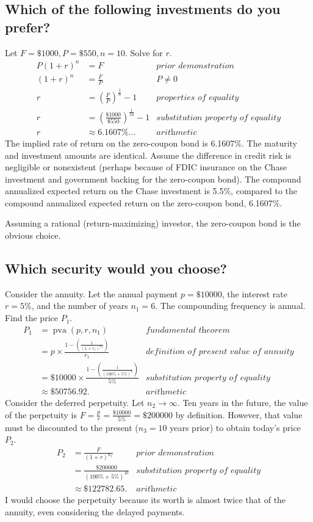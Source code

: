 \documentclass[12pt]{article}
\DeclareMathOperator{\pva}{pva}
\begin{document}
\subsection{Which of the following investments do you prefer?}
Let $F=\$1000,P=\$550,n=10$. Solve for $r$.
\begin{align*}
P(1+r)^n&=F&\textit{prior demonstration}\\
(1+r)^n&=\frac{F}{P}&\textit{$P\neq 0$}\\
r&=\left(\frac{F}{P}\right)^{\frac{1}{n}}-1&\textit{properties of equality}\\
r&=\left(\frac{\$1000}{\$550}\right)^{\frac{1}{10}}-1&\textit{substitution property of equality}\\
r&\approx 6.1607\%\dots&\textit{arithmetic}
\end{align*}
The implied rate of return on the zero-coupon bond is 6.1607\%. The maturity and investment amounts are identical. Assume the difference in credit risk is negligible or nonexistent (perhaps because of FDIC insurance on the Chase investment and government backing for the zero-coupon bond). The compound annualized expected return on the Chase investment is 5.5\%, compared to the compound annualized expected return on the zero-coupon bond, 6.1607\%.

Assuming a rational (return-maximizing) investor, the zero-coupon bond is the obvious choice.
\subsection{Which security would you choose?}
Consider the annuity. Let the annual payment $p=\$10000$, the interest rate $r=5\%$, and the number of years $n_1=6$. The compounding frequency is annual. Find the price $P_1$.
\begin{align*}
P_1&=\pva(p,r,n_1)&\textit{fundamental theorem}\\
&=p\times\frac{1-\left(\frac{1}{(1+r_1)^{n_1}}\right)}{r_1}&\textit{definition of present value of annuity}\\
&=\$10000\times\frac{1-\left(\frac{1}{(100\%+5\%)^6}\right)}{5\%}&\textit{substitution property of equality}\\
&\approx\$50756.92.&\textit{arithmetic}
\end{align*}
Consider the deferred perpetuity. Let $n_2\to\infty$. Ten years in the future, the value of the perpetuity is $F=\frac{p}{r}=\frac{\$10000}{5\%}=\$200000$ by definition. However, that value must be discounted to the present ($n_3=10$ years prior) to obtain today's price $P_2$.
\begin{align*}
P_2&=\frac{F}{(1+r)^{n_3}}&\textit{prior demonstration}\\
&=\frac{\$200000}{(100\%+5\%)^{10}}&\textit{substitution property of equality}\\
&\approx\$122782.65.&\textit{arithmetic}
\end{align*}
I would choose the perpetuity because its worth is almost twice that of the annuity, even considering the delayed payments.
\end{document}
